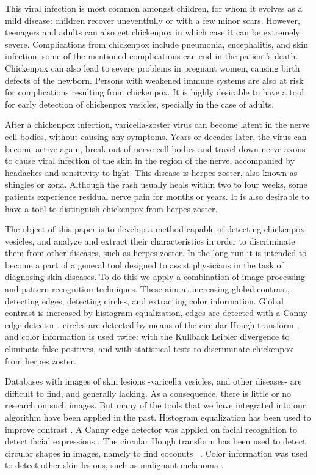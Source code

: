 \documentclass[oribibl]{llncs}
\begin{document}
This viral infection is most common amongst children, for whom it evolves as a mild disease: children recover uneventfully or with a few minor scars. However, teenagers and adults can also get chickenpox 
in which case it can be extremely severe. Complications from chickenpox include pneumonia, encephalitis, and skin infection; some of the mentioned complications can end in the patient's death.  Chickenpox can also lead 
to severe problems in pregnant women, causing birth defects of the newborn. Persons with weakened immune systems are also at risk for complications resulting from chickenpox. It is highly desirable to have a tool for 
early detection of chickenpox vesicles, specially in the case of adults.

After a chickenpox infection, varicella-zoster virus can become latent in the nerve cell bodies, 
 without causing any symptoms. Years or decades later, the virus can become active again, break out of nerve cell bodies and travel down nerve axons to cause viral infection of the skin in the region of the nerve, accompanied by headaches and sensitivity to light.
This disease is herpes zoster, also known as shingles or zona. Although the rash usually heals within two to four weeks, some patients experience residual nerve pain for months or years. 
It is also desirable to have a tool to distinguish chickenpox from herpes zoster. 


The object of this paper is to develop a method capable of detecting chickenpox vesicles, and analyze and extract their characteristics in order to discriminate them from other diseases, such as herpes-zoster. 
In the long run it is intended to become a part of a general tool designed 
to assist physicians in the task of diagnosing skin diseases.
To do this we apply a combination of image processing and pattern recognition techniques. These aim at increasing global contrast, detecting edges, detecting circles, and extracting color information. Global contrast is increased by histogram equalization, 
edges are detected with a Canny edge detector
, circles are detected by means of the circular Hough transform
, and color information is used twice: 
with the  Kullback Leibler divergence 
to eliminate false positives, and with statistical tests to discriminate chickenpox from herpes zoster. 

Databases with images of skin lesions -varicella vesicles,  
and other diseases- are difficult to find, and generally lacking. As a consequence, there is little or no research on such images. 
But many of the tools that we have integrated into our algorithm have been applied in the past. Histogram equalization has been used to improve contrast \cite{a_novel_approach_contrast}. 
A Canny edge detector was applied on facial recognition to detect 
facial expressions \cite{real_time_facial}. 
The circular Hough transform has been used to detect circular shapes in images, namely to find coconuts ~\cite{CH01}. 
Color information was used to detect other skin lesions, such as  
malignant melanoma \cite{LC01}.
\end{document}
